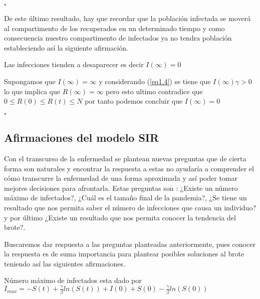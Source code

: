 \hfill	$\square$

De este último resultado, hay que recordar que la población infectada se moverá al compartimento de los recuperados en un determinado tiempo y como consecuencia nuestro compartimento
de infectados ya no tendra población estableciendo así la siguiente afirmación.

\begin{Af}
Las infecciones tienden a desaparecer es decir $I(\infty) = 0$
\end{Af}

\begin{Dem}

Supongamos que $I(\infty) = \infty$ y considerando (\ref{eq1.4}) se tiene que $I(\infty) \gamma > 0$ lo que implica que $R(\infty) = \infty$ pero esto ultimo contradice que $0 \leq R(0) \leq R(t) \leq N$  por tanto podemos concluir que $I(\infty) = 0$

\end{Dem}

\hfill	$\square$

\subsection{Afirmaciones del modelo SIR}
Con el transcurso de la enfermedad se plantean nuevas preguntas que de cierta forma son naturales y encontrar la respuesta a estas no ayudaría a comprender el cómo transcurre la enfermedad de una forma aproximada y así poder tomar mejores decisiones para afrontarla. Estas preguntas son : ¿Existe un número máximo de infectados?, ¿Cuál es el tamaño final de la pandemia?, ¿Se tiene un resultado que nos permita saber el número de infecciones que causa un individuo? y por último ¿Existe un resultado que nos permita conocer la tendencia del brote?.

Buscaremos dar respuesta a las preguntas planteadas anteriormente, pues conocer la respuesta es de suma importancia para plantear posibles soluciones al brote teniendo así las siguientes afirmaciones.


\begin{Af}
Número máximo de infectados esta dado por $I_{max} = - S(t) + \frac{\gamma}{\beta} ln(S(t)) + I(0) + S(0) - \frac{\gamma}{\beta} ln(S(0))$
\end{Af}


